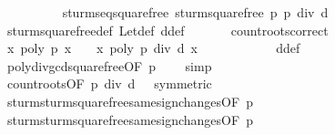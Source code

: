 \begin{isabellebody}
\ \ \ \ \ \ \ \ \isamarkupfalse%
\ sturm{\isacharunderscore}seq{\isacharunderscore}squarefree\ {\isachardoublequoteopen}sturm{\isacharunderscore}squarefree{\isacharprime}\ p{\isachardoublequoteclose}\ {\isachardoublequoteopen}p\ div\ d{\isachardoublequoteclose}\isanewline
\ \ \ \ \ \ \ \ \isamarkupfalse%
\ sturm{\isacharunderscore}squarefree{\isacharprime}{\isacharunderscore}def\ Let{\isacharunderscore}def\ d{\isacharunderscore}def\ \isacommand{{\isachardot}}\isamarkupfalse%
\isanewline
\isanewline
\ \ \ \ \isamarkupfalse%
\ count{\isacharunderscore}roots{\isacharunderscore}correct\isanewline
\ \ \ \ \isamarkupfalse%
\ \isamarkupfalse%
\ {\isachardoublequoteopen}{\isacharbraceleft}x{\isachardot}\ poly\ p\ x\ {\isacharequal}\ {}{\isacharbraceright}\ {\isacharequal}\ {\isacharbraceleft}x{\isachardot}\ poly\ {\isacharparenleft}p\ div\ d{\isacharparenright}\ x\ {\isacharequal}\ {}{\isacharbraceright}{\isachardoublequoteclose}\isanewline
\ \ \ \ \ \ \ \ \isamarkupfalse%
\ d{\isacharunderscore}def\ \isamarkupfalse%
\ poly{\isacharunderscore}div{\isacharunderscore}gcd{\isacharunderscore}squarefree{\isacharparenleft}{}{\isacharparenright}{\isacharbrackleft}OF\ {\isacharbackquoteopen}p\ {\isasymnoteq}\ {}{\isacharbackquoteclose}{\isacharbrackright}\ \isamarkupfalse%
\ simp\isanewline
\ \ \ \ \isamarkupfalse%
\ \isamarkupfalse%
\ count{\isacharunderscore}roots{\isacharbrackleft}OF\ {\isacharbackquoteopen}p\ div\ d\ {\isasymnoteq}\ {}{\isacharbackquoteclose}{\isacharcomma}\ symmetric{\isacharbrackright}\isanewline
\ \ \ \ \isamarkupfalse%
\ \isamarkupfalse%
\ sturm{\isacharunderscore}sturm{\isacharunderscore}squarefree{\isacharprime}{\isacharunderscore}same{\isacharunderscore}sign{\isacharunderscore}changes{\isacharparenleft}{}{\isacharparenright}{\isacharbrackleft}OF\ {\isacharbackquoteopen}p\ {\isasymnoteq}\ {}{\isacharbackquoteclose}{\isacharbrackright}\isanewline
\ \ \ \ \isamarkupfalse%
\ \isamarkupfalse%
\ sturm{\isacharunderscore}sturm{\isacharunderscore}squarefree{\isacharprime}{\isacharunderscore}same{\isacharunderscore}sign{\isacharunderscore}changes{\isacharparenleft}{}{\isacharparenright}{\isacharbrackleft}OF\ {\isacharbackquoteopen}p\ {\isasymnoteq}\ {}{\isacharbackquoteclose}{\isacharbrackright}\isanewline

\end{isabellebody}
